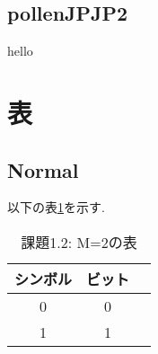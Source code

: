 \documentclass{jsarticle}	       %
\begin{document}
		\subsection{pollenJPJP2}
			hello
	
	\section{表}
		\subsection{Normal}
		以下の表\ref{課題1.2: M=2の表}を示す.
		\begin{table}[H]  %
			\caption[M=2]{課題1.2: M=2の表}
			\label{課題1.2: M=2の表}
			\begin{center}
				\setlength{\tabcolsep}{3pt}
				\footnotesize
				\begin{tabular}{|c|c|c} \hline
					シンボル & ビット \\ \hline \hline
					0 & 0 \\ \hline
					1 & 1 \\ \hline
				\end{tabular}
			\end{center}
		\end{table}
		
\end{document}
